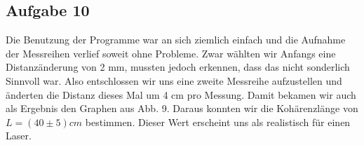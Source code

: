 \subsection{Aufgabe 10}
Die Benutzung der Programme war an sich ziemlich einfach und die Aufnahme der Messreihen verlief soweit ohne Probleme. Zwar wählten wir Anfangs eine Distanzänderung von 2 mm, mussten jedoch erkennen, dass das nicht sonderlich Sinnvoll war. Also entschlossen wir uns eine zweite Messreihe aufzustellen und änderten die Distanz dieses Mal um 4 cm pro Messung. Damit bekamen wir auch als Ergebnis den Graphen aus Abb. 9. Daraus konnten wir die Kohärenzlänge von $L = (40 \pm 5)cm$ bestimmen. Dieser Wert erscheint uns als realistisch für einen Laser.